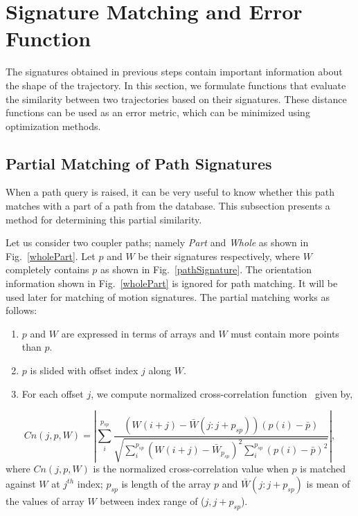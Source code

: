 \documentclass[twocolumn,10pt]{asme2ej}
\begin{document}
\section{Signature Matching and Error Function}\label{sec_distanceMetric}
The signatures obtained in previous steps contain important information about the shape of the trajectory.
In this section, we formulate functions that evaluate the similarity between two trajectories based on their signatures.
These distance functions can be used as an error metric, which can be minimized using optimization methods.

\subsection{Partial Matching of Path Signatures}\label{sec_ncc}
When a path query is raised, it can be very useful to know whether this path matches with a part of a path from the database.
This subsection presents a method for determining this partial similarity.

Let us consider two coupler paths; namely \emph{Part} and \emph{Whole} as shown in Fig.~\ref{wholePart}.
Let $p$ and $W$ be their signatures respectively, where $W$ completely contains $p$ as shown in Fig.~\ref{pathSignature}.
The orientation information shown in Fig.~\ref{wholePart} is ignored for path matching. It will be used later for matching of motion signatures.
The partial matching works as follows:

\begin{enumerate}
  \item $p$ and $W$ are expressed in terms of arrays and $W$ must contain more points than $p$.
  \item $p$ is slided with offset index $j$ along $W$.
  \item For each offset $j$, we compute normalized cross-correlation function~\cite{lewis1995fast}  given by,
\end{enumerate}
\vspace{-0.6cm}
\begin{equation}\label{nccEq}
  Cn(j, p, W) = |\sum_{i}^{p_{sp}} \frac{(W(i+j) - \bar{W}(j : j + p_{sp}))(p(i) - \bar{p})}{\sqrt{\sum_{i}^{p_{sp}}{(W(i+j) - \bar{W}_{p_{sp}})}^2\sum_{i}^{p_{sp}}{(p(i) - \bar{p})}^2}} |,
\end{equation}
where $Cn(j, p, W)$ is the normalized cross-correlation value when $p$ is matched against $W$ at $j^{th}$ index; $p_{sp}$ is length of the array $p$ and $\bar{W}(j:j + p_{sp})$ is mean of the values of array $W$ between index range of ($j, j+p_{sp}$).
\end{document}
